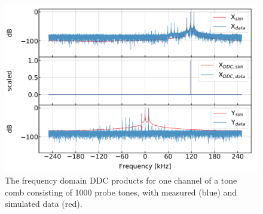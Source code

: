 \begin{figure}[!htbp]
\centering
\includegraphics[width=\textwidth]{figures/readout/sim/ddc_sim_100}
\caption[~An example of the frequency domain DDC products (measured and simulated) for one channel of a tone comb consisting of 1000 tones.]{The frequency domain DDC products for one channel of a tone comb consisting of 1000 probe tones, with measured (blue) and simulated data (red).}
\label{fig:ddc1000}
\end{figure}

